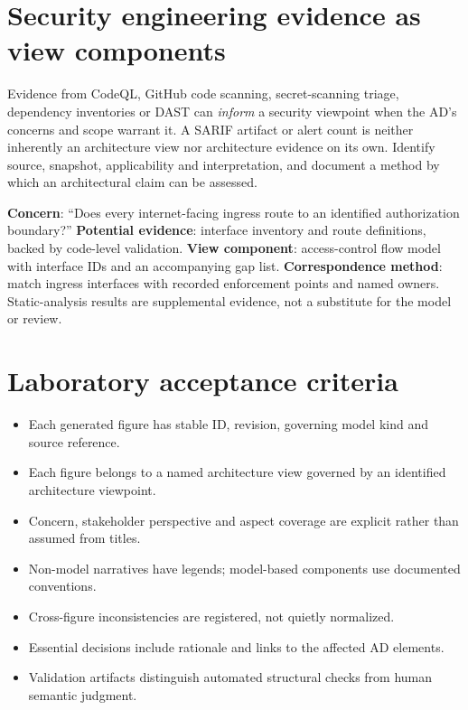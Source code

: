 \documentclass[11pt,letterpaper]{article}
\begin{document}
\section{Security engineering evidence as view components}
Evidence from CodeQL, GitHub code scanning, secret-scanning triage, dependency inventories or DAST can \emph{inform} a security viewpoint when the AD's concerns and scope warrant it. A SARIF artifact or alert count is neither inherently an architecture view nor architecture evidence on its own. Identify source, snapshot, applicability and interpretation, and document a method by which an architectural claim can be assessed.\par
\begin{Worked}\textbf{Concern}: ``Does every internet-facing ingress route to an identified authorization boundary?'' \textbf{Potential evidence}: interface inventory and route definitions, backed by code-level validation. \textbf{View component}: access-control flow model with interface IDs and an accompanying gap list. \textbf{Correspondence method}: match ingress interfaces with recorded enforcement points and named owners. Static-analysis results are supplemental evidence, not a substitute for the model or review.\end{Worked}
\section{Laboratory acceptance criteria}
\begin{itemize}
\item Each generated figure has stable ID, revision, governing model kind and source reference.
\item Each figure belongs to a named architecture view governed by an identified architecture viewpoint.
\item Concern, stakeholder perspective and aspect coverage are explicit rather than assumed from titles.
\item Non-model narratives have legends; model-based components use documented conventions.
\item Cross-figure inconsistencies are registered, not quietly normalized.
\item Essential decisions include rationale and links to the affected AD elements.
\item Validation artifacts distinguish automated structural checks from human semantic judgment.
\end{itemize}
\LegalFooter
\end{document}
